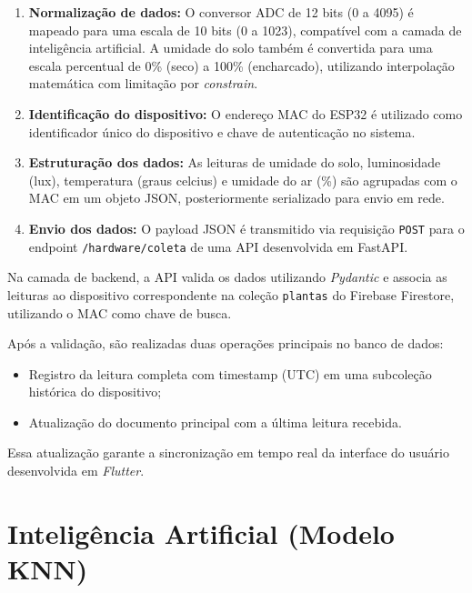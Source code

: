 \documentclass[
	12pt,
	article,
	oneside,
	a4paper,
	english,
	brazil
	]{abntex2}
\begin{document}
\begin{enumerate}
    \item \textbf{Normalização de dados:} O conversor ADC de 12 bits (0 a 4095) é mapeado para uma escala de 10 bits (0 a 1023), compatível com a camada de inteligência artificial. A umidade do solo também é convertida para uma escala percentual de 0\% (seco) a 100\% (encharcado), utilizando interpolação matemática com limitação por \textit{constrain}.

    \item \textbf{Identificação do dispositivo:} O endereço MAC do ESP32 é utilizado como identificador único do dispositivo e chave de autenticação no sistema.

    \item \textbf{Estruturação dos dados:} As leituras de umidade do solo, luminosidade (lux), temperatura (graus celcius) e umidade do ar (\%) são agrupadas com o MAC em um objeto JSON, posteriormente serializado para envio em rede.

    \item \textbf{Envio dos dados:} O payload JSON é transmitido via requisição \texttt{POST} para o endpoint \texttt{/hardware/coleta} de uma API desenvolvida em FastAPI.
\end{enumerate}

Na camada de backend, a API valida os dados utilizando \textit{Pydantic} e associa as leituras ao dispositivo correspondente na coleção \texttt{plantas} do Firebase Firestore, utilizando o MAC como chave de busca.

Após a validação, são realizadas duas operações principais no banco de dados:

\begin{itemize}
    \item Registro da leitura completa com timestamp (UTC) em uma subcoleção histórica do dispositivo;
    \item Atualização do documento principal com a última leitura recebida.
\end{itemize}

Essa atualização garante a sincronização em tempo real da interface do usuário desenvolvida em \textit{Flutter}.

\section{Inteligência Artificial (Modelo KNN)}

\end{document}
